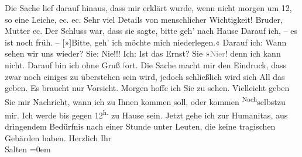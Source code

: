 \begin{ledgroupsized}[t]{13cm}
           \pstart
           Die Sache lief darauf hinaus, dass mir erklärt wurde, wenn nicht morgen
               um 12, so  eine Leiche, ec. ec. Sehr
               viel Details von menschlicher Wichtigkeit! Bruder, Mutter ec. \pend
           \pstart
           Der Schluss war, dass sie
               sagte, bitte geh’ nach Hause{\dotstwo} Darauf ich, – es ist noch
               früh. – {[}»{]}Bitte, geh’ ich möchte mich niederlegen.« Darauf ich:
               Wann sehen wir uns wieder? Sie: Nie!!! Ich: Ist das Ernst? Sie »\textcolor{gray}{Ni{\geminationm}er}!
                  {\pb}denn ich kann nicht.
               Darauf bin ich ohne Gruß \textcolor{gray}{f}ort. \pend
           \pstart
           Die Sache macht mir den Eindruck, dass zwar noch einiges zu überstehen sein wird,
               jedoch schließlich wird sich All das geben. Es braucht nur Vorsicht. \pend
           \pstart
           Morgen hoffe ich Sie zu sehen. Vielleicht geben Sie mir Nachricht, wann
               ich zu Ihnen kommen soll,  oder kommen \substVorne{}\textsuperscript{Nach}\substDazwischen{}selbst\substHinten{}{ }{\pb}zu mir. Ich werde bis gegen
                  12\textsuperscript{h.} zu Hause sein. \pend
           \pstart
           Jetzt gehe ich zur Humanitas, aus dringendem
               Bedürfnis nach einer Stunde unter Leuten, die keine tragischen Gebärden haben. \pend
           \pstart
           Herzlich Ihr {\\[\baselineskip]}\spacefill\mbox{Salten}\pend
           \leftskip=0em{}
         
         \endnumbering{}\end{ledgroupsized}\begin{anhang}\end{anhang}\newcommand{\dateiname}{L03149}\newcommand{\titel}{Felix Salten an Arthur Schnitzler, [26. 1. 1895]}\newcommand{\editorInnen}{Martin Anton Müller und Laura Untner}
      